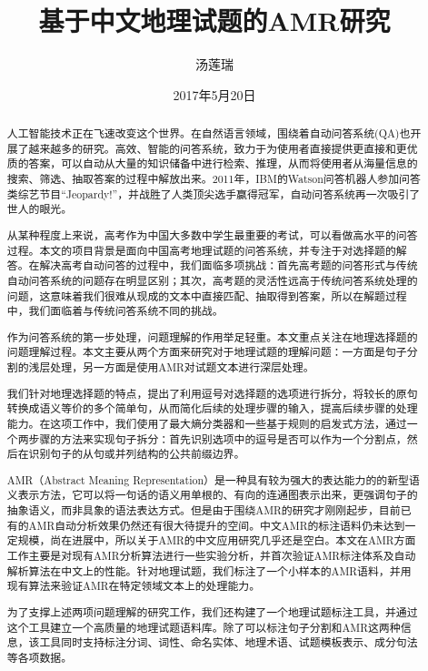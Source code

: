 \documentclass[master, winfont]{njuthesis}
\title{基于中文地理试题的AMR研究}
\author{汤莲瑞}
\institute{南京大学}
\date{2017年5月20日}
\begin{document}

\maketitle
\makeenglishtitle


\frontmatter

\begin{abstract}
人工智能技术正在飞速改变这个世界。在自然语言领域，围绕着自动问答系统(QA)也开展了越来越多的研究。高效、智能的问答系统，致力于为使用者直接提供更直接和更优质的答案，可以自动从大量的知识储备中进行检索、推理，从而将使用者从海量信息的搜索、筛选、抽取答案的过程中解放出来。2011年，IBM的Watson问答机器人参加问答类综艺节目“Jeopardy!”，并战胜了人类顶尖选手赢得冠军，自动问答系统再一次吸引了世人的眼光。

从某种程度上来说，高考作为中国大多数中学生最重要的考试，可以看做高水平的问答过程。本文的项目背景是面向中国高考地理试题的问答系统，并专注于对选择题的解答。在解决高考自动问答的过程中，我们面临多项挑战：首先高考题的问答形式与传统自动问答系统的问题存在明显区别；其次，高考题的灵活性远高于传统问答系统处理的问题，这意味着我们很难从现成的文本中直接匹配、抽取得到答案，所以在解题过程中，我们面临着与传统问答系统不同的挑战。

作为问答系统的第一步处理，问题理解的作用举足轻重。本文重点关注在地理选择题的问题理解过程。本文主要从两个方面来研究对于地理试题的理解问题：一方面是句子分割的浅层处理，另一方面是使用AMR对试题文本进行深层处理。

我们针对地理选择题的特点，提出了利用逗号对选择题的选项进行拆分，将较长的原句转换成语义等价的多个简单句，从而简化后续的处理步骤的输入，提高后续步骤的处理能力。在这项工作中，我们使用了最大熵分类器和一些基于规则的启发式方法，通过一个两步骤的方法来实现句子拆分：首先识别选项中的逗号是否可以作为一个分割点，然后在识别句子的从句或并列结构的公共前缀边界。

AMR（Abstract Meaning Representation）是一种具有较为强大的表达能力的的新型语义表示方法，它可以将一句话的语义用单根的、有向的连通图表示出来，更强调句子的抽象语义，而非具象的语法表达方式。但是由于围绕AMR的研究才刚刚起步，目前已有的AMR自动分析效果仍然还有很大待提升的空间。中文AMR的标注语料仍未达到一定规模，尚在进展中，所以关于AMR的中文应用研究几乎还是空白。本文在AMR方面工作主要是对现有AMR分析算法进行一些实验分析，并首次验证AMR标注体系及自动解析算法在中文上的性能。针对地理试题，我们标注了一个小样本的AMR语料，并用现有算法来验证AMR在特定领域文本上的处理能力。

为了支撑上述两项问题理解的研究工作，我们还构建了一个地理试题标注工具，并通过这个工具建立一个高质量的地理试题语料库。除了可以标注句子分割和AMR这两种信息，该工具同时支持标注分词、词性、命名实体、地理术语、试题模板表示、成分句法等各项数据。

\end{abstract}
\end{document}
